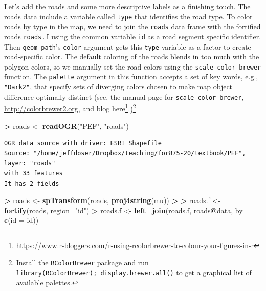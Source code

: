 \documentclass[
]{krantz}
\makeatletter
\newenvironment{Shaded}{\begin{snugshade}}{\end{snugshade}}
\newcommand{\DataTypeTok}[1]{\textcolor[rgb]{0.27,0.27,0.27}{#1}}
\newcommand{\ErrorTok}[1]{\textcolor[rgb]{0.14,0.14,0.14}{\textbf{#1}}}
\newcommand{\KeywordTok}[1]{\textcolor[rgb]{0.27,0.27,0.27}{\textbf{#1}}}
\newcommand{\NormalTok}[1]{#1}
\newcommand{\OperatorTok}[1]{\textcolor[rgb]{0.43,0.43,0.43}{\textbf{#1}}}
\newcommand{\StringTok}[1]{\textcolor[rgb]{0.5,0.5,0.5}{#1}}
\renewcommand{\href}[2]{#2\footnote{\url{#1}}}
\newenvironment{kframe}{%
\medskip{}
\setlength{\fboxsep}{.8em}
 \def\at@end@of@kframe{}%
 \ifinner\ifhmode%
  \def\at@end@of@kframe{\end{minipage}}%
  \begin{minipage}{\columnwidth}%
 \fi\fi%
 \def\FrameCommand##1{\hskip\@totalleftmargin \hskip-\fboxsep
 \colorbox{shadecolor}{##1}\hskip-\fboxsep
     \hskip-\linewidth \hskip-\@totalleftmargin \hskip\columnwidth}%
 \MakeFramed {\advance\hsize-\width
   \@totalleftmargin\z@ \linewidth\hsize
   \@setminipage}}%
 {\par\unskip\endMakeFramed%
 \at@end@of@kframe}
\renewenvironment{Shaded}{\begin{kframe}}{\end{kframe}}
\makeatother
\begin{document}
Let's add the roads and some more descriptive labels as a finishing touch. The roads data include a variable called \texttt{type} that identifies the road type. To color roads by type in the map, we need to join the \texttt{roads} data frame with the fortified roads \texttt{roads.f} using the common variable \texttt{id} as a road segment specific identifier. Then \texttt{geom\_path}'s \texttt{color} argument gets this \texttt{type} variable as a factor to create road-specific color. The default coloring of the roads blends in too much with the polygon colors, so we manually set the road colors using the \texttt{scale\_color\_brewer} function. The \texttt{palette} argument in this function accepts a set of key words, e.g., \texttt{"Dark2"}, that specify sets of diverging colors chosen to make map object difference optimally distinct (see, the manual page for \texttt{scale\_color\_brewer}, \url{http://colorbrewer2.org}, and blog \href{https://www.r-bloggers.com/r-using-rcolorbrewer-to-colour-your-figures-in-r}{here}.)\footnote{Install the \texttt{RColorBrewer} package and run \texttt{library(RColorBrewer);\ display.brewer.all()} to get a graphical list of available palettes.}

\begin{Shaded}
\begin{Highlighting}[]
\OperatorTok{\textgreater{}}\StringTok{ }\NormalTok{roads \textless{}{-}}\StringTok{ }\KeywordTok{readOGR}\NormalTok{(}\StringTok{"PEF"}\NormalTok{, }\StringTok{"roads"}\NormalTok{)}
\end{Highlighting}
\end{Shaded}

\begin{verbatim}
OGR data source with driver: ESRI Shapefile 
Source: "/home/jeffdoser/Dropbox/teaching/for875-20/textbook/PEF", layer: "roads"
with 33 features
It has 2 fields
\end{verbatim}

\begin{Shaded}
\begin{Highlighting}[]
\OperatorTok{\textgreater{}}\StringTok{ }\NormalTok{roads \textless{}{-}}\StringTok{ }\KeywordTok{spTransform}\NormalTok{(roads, }\KeywordTok{proj4string}\NormalTok{(mu))}
\OperatorTok{\textgreater{}}\StringTok{ }
\ErrorTok{\textgreater{}}\StringTok{ }\NormalTok{roads.f \textless{}{-}}\StringTok{ }\KeywordTok{fortify}\NormalTok{(roads, }\DataTypeTok{region=}\StringTok{"id"}\NormalTok{)}
\OperatorTok{\textgreater{}}\StringTok{ }\NormalTok{roads.f \textless{}{-}}\StringTok{ }\KeywordTok{left\_join}\NormalTok{(roads.f, roads}\OperatorTok{@}\NormalTok{data, }\DataTypeTok{by =} \KeywordTok{c}\NormalTok{(}\StringTok{\textquotesingle{}id\textquotesingle{}}\NormalTok{ =}\StringTok{ \textquotesingle{}id\textquotesingle{}}\NormalTok{))}
\end{Highlighting}
\end{Shaded}
\end{document}
